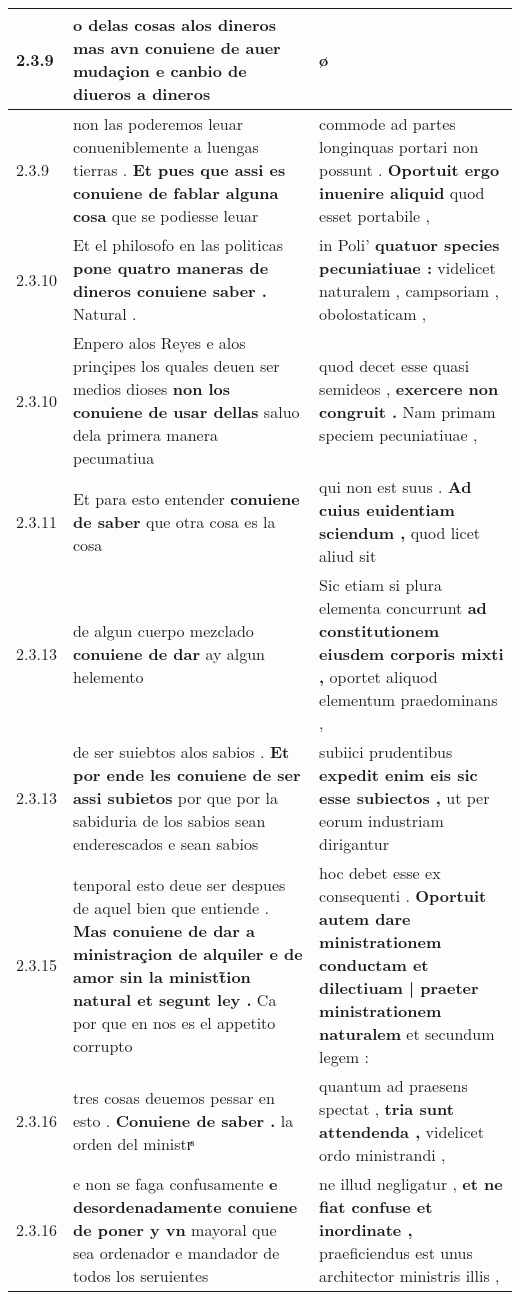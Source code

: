 \begin{tabular}{|p{1cm}|p{6.5cm}|p{6.5cm}|}
2.3.9 & o delas cosas alos dineros \textbf{ mas avn conuiene de auer mudaçion } e canbio de diueros a dineros & ø \\\hline
2.3.9 & non las poderemos leuar conueniblemente a luengas tierras . \textbf{ Et pues que assi es conuiene de fablar alguna cosa } que se podiesse leuar & commode ad partes longinquas portari non possunt . \textbf{ Oportuit ergo inuenire aliquid } quod esset portabile , \\\hline
2.3.10 & Et el philosofo en las politicas \textbf{ pone quatro maneras de dineros conuiene saber . } Natural . & in Poli’ \textbf{ quatuor species pecuniatiuae : } videlicet naturalem , campsoriam , obolostaticam , \\\hline
2.3.10 & Enpero alos Reyes e alos prinçipes los quales deuen ser medios dioses \textbf{ non los conuiene de usar dellas } saluo dela primera manera pecumatiua & quod decet esse quasi semideos , \textbf{ exercere non congruit . } Nam primam speciem pecuniatiuae , \\\hline
2.3.11 & Et para esto entender \textbf{ conuiene de saber } que otra cosa es la cosa & qui non est suus . \textbf{ Ad cuius euidentiam sciendum , } quod licet aliud sit \\\hline
2.3.13 & de algun cuerpo mezclado \textbf{ conuiene de dar } ay algun helemento & Sic etiam si plura elementa concurrunt \textbf{ ad constitutionem eiusdem corporis mixti , } oportet aliquod elementum praedominans , \\\hline
2.3.13 & de ser suiebtos alos sabios . \textbf{ Et por ende les conuiene de ser assi subietos } por que por la sabiduria de los sabios sean enderescados e sean sabios & subiici prudentibus \textbf{ expedit enim eis sic esse subiectos , } ut per eorum industriam dirigantur \\\hline
2.3.15 & tenporal esto deue ser despues de aquel bien que entiende . \textbf{ Mas conuiene de dar a ministraçion de alquiler e de amor sin la ministt̃ion natural et segunt ley . } Ca por que en nos es el appetito corrupto & hoc debet esse ex consequenti . \textbf{ Oportuit autem dare ministrationem conductam et dilectiuam | praeter ministrationem naturalem } et secundum legem : \\\hline
2.3.16 & tres cosas deuemos pessar en esto . \textbf{ Conuiene de saber . } la orden del ministrͣ & quantum ad praesens spectat , \textbf{ tria sunt attendenda , } videlicet ordo ministrandi , \\\hline
2.3.16 & e non se faga confusamente \textbf{ e desordenadamente conuiene de poner y vn } mayoral que sea ordenador e mandador de todos los seruientes & ne illud negligatur , \textbf{ et ne fiat confuse et inordinate , } praeficiendus est unus architector ministris illis , \\\hline

\end{tabular}
